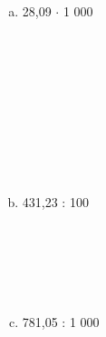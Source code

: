 \documentclass[a4paper,14pt]{article}
\begin{document}
\begin{multicols}{2}
\begin{enumerate}
\begin{enumerate}[a)]
   				\item 28,09 $\cdot$ 1 000
   				\\\\\\\\\\\\\\\\\\\\
   				\item 431,23 : 100 \\\\\\\\\\\\
   				\item 781,05 : 1 000
   				\\\\\\\\\\\\\\\\\\\\
   			\end{enumerate} 
   		\end{enumerate}
        $~$ \\ $~$ \\ $~$ \\ $~$ \\ $~$ \\ $~$ \\ $~$ \\ $~$ \\ $~$ \\ $~$ \\ $~$ \\ $~$ \\ $~$ \\ $~$ \\ $~$ \\ $~$ \\ $~$ \\ $~$ \\ $~$ \\ $~$ \\ $~$ \\ $~$ \\ $~$ \\ $~$ \\ $~$ \\ $~$ \\ $~$ \\ $~$ \\ $~$ \\ $~$ 
        \end{multicols}
\end{document}

